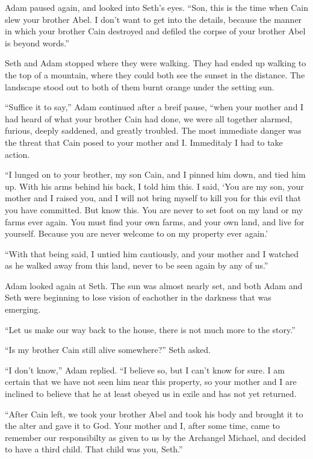 \documentclass[12pt,twoside,titlepage]{report}
\begin{document}
Adam paused again, and looked into Seth's eyes. ``Son, this is the time
when Cain slew your brother Abel. I don't want to get into the details,
because the manner in which your brother Cain destroyed and defiled the
corpse of your brother Abel is beyond words.''

Seth and Adam stopped where they were walking. They had ended up walking
to the top of a mountain, where they could both see the sunset in the
distance. The landscape stood out to both of them burnt orange under the
setting sun.

``Suffice it to say,'' Adam continued after a breif pause, ``when your
mother and I had heard of what your brother Cain had done, we were all
together alarmed, furious, deeply saddened, and greatly troubled. The
most immediate danger was the threat that Cain posed to your mother and
I. Immeditaly I had to take action.

``I lunged on to your brother, my son Cain, and I pinned him down, and
tied him up. With his arms behind his back, I told him this. I said,
`You are my son, your mother and I raised you, and I will not bring
myself to kill you for this evil that you have committed. But know this.
You are never to set foot on my land or my farms ever again. You must
find your own farms, and your own land, and live for yourself. Because
you are never welcome to on my property ever again.'

``With that being said, I untied him cautiously, and your mother and I
watched as he walked away from this land, never to be seen again by any
of us.''

Adam looked again at Seth. The sun was almost nearly set, and both Adam
and Seth were beginning to lose vision of eachother in the darkness that
was emerging.

``Let us make our way back to the house, there is not much more to the
story.''

``Is my brother Cain still alive somewhere?'' Seth asked.

``I don't know,'' Adam replied. ``I believe so, but I can't know for
sure. I am certain that we have not seen him near this property, so your
mother and I are inclined to believe that he at least obeyed us in exile
and has not yet returned.

``After Cain left, we took your brother Abel and took his body and
brought it to the alter and gave it to God. Your mother and I, after
some time, came to remember our responsibilty as given to us by the
Archangel Michael, and decided to have a third child. That child was
you, Seth.''
\end{document}
